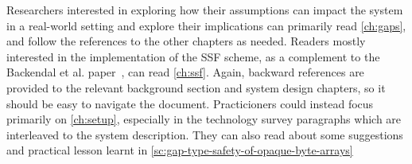 Researchers interested in exploring how their assumptions can impact the system in a real-world setting and explore their implications can primarily read \cref{ch:gaps}, and follow the references to the other chapters as needed.
Readers mostly interested in the implementation of the SSF scheme, as a complement to the Backendal et al. paper~\cite{GKP}, can read \cref{ch:ssf}. Again, backward references are provided to the relevant background section and system design chapters, so it should be easy to navigate the document.
Practicioners could instead focus primarily on \cref{ch:setup}, especially in the technology survey paragraphs which are interleaved to the system description. They can also read about some suggestions and practical lesson learnt in \cref{sc:gap-type-safety-of-opaque-byte-arrays}
